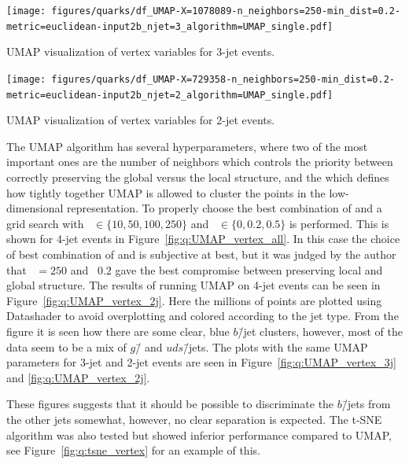\begin{marginfigure}
  \centerfloat
  \texttt{[image: figures/quarks/df\_UMAP-X=1078089-n\_neighbors=250-min\_dist=0.2-metric=euclidean-input2b\_njet=3\_algorithm=UMAP\_single.pdf]}
  \caption[UMAP visualization of vertex variables for 3-jet events]
          {UMAP visualization of vertex variables for 3-jet events.} 
  \label{fig:q:UMAP_vertex_3j}
\end{marginfigure}

\begin{marginfigure}
  \centerfloat
  \texttt{[image: figures/quarks/df\_UMAP-X=729358-n\_neighbors=250-min\_dist=0.2-metric=euclidean-input2b\_njet=2\_algorithm=UMAP\_single.pdf]}
  \caption[UMAP visualization of vertex variables for 2-jet events]
          {UMAP visualization of vertex variables for 2-jet events.} 
  \label{fig:q:UMAP_vertex_2j}
\end{marginfigure}

The UMAP algorithm has several hyperparameters, where two of the most important ones are the number of neighbors  which controls the priority between correctly preserving the global versus the local structure, and the  which defines how tightly together UMAP is allowed to cluster the points in the low-dimensional representation. To properly choose the best combination of  and  a grid search with ~$\in \{10, 50, 100, 250 \}$ and ~$\in \{0, 0.2, 0.5\}$ is performed. This is shown for 4-jet events in Figure~\ref{fig:q:UMAP_vertex_all}. In this case the choice of best combination of  and  is subjective at best, but it was judged by the author that ~$=250$ and ~$0.2$ gave the best compromise between preserving local and global structure. The results of running UMAP on 4-jet events can be seen in Figure~\ref{fig:q:UMAP_vertex_2j}. Here the millions of points are plotted using Datashader \autocite{bednarDatashaderRevealingStructure2019} to avoid overplotting and colored according to the jet type. From the figure it is seen how there are some clear, blue $b$\=/jet clusters, however, most of the data seem to be a mix of $g$\=/ and $uds$\=/jets. The plots with the same UMAP parameters for 3-jet and 2-jet events are seen in Figure~\ref{fig:q:UMAP_vertex_3j} and \ref{fig:q:UMAP_vertex_2j}. 

These figures suggests that it should be possible to discriminate the $b$\=/jets from the other jets somewhat, however, no clear separation is expected. The t-SNE algorithm was also tested but showed inferior performance compared to UMAP, see Figure~\ref{fig:q:tsne_vertex} for an example of this.



